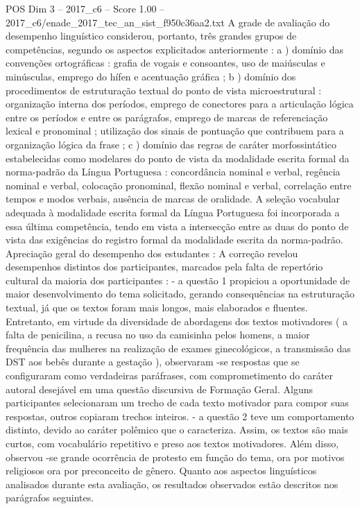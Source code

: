 \begin{textsample}{POS Dim 3 – 2017\_c6 – Score 1.00 – 2017\_c6/enade\_2017\_tec\_an\_sist\_f950c36aa2.txt}
A grade de avaliação do desempenho linguístico considerou, portanto, três grandes grupos de competências, segundo os aspectos explicitados anteriormente : a ) domínio das convenções ortográficas : grafia de vogais e consoantes, uso de maiúsculas e minúsculas, emprego do hífen e acentuação gráfica ; b ) domínio dos procedimentos de estruturação textual do ponto de vista microestrutural : organização interna dos períodos, emprego de conectores para a articulação lógica entre os períodos e entre os parágrafos, emprego de marcas de referenciação lexical e pronominal ; utilização dos sinais de pontuação que contribuem para a organização lógica da frase ; c ) domínio das regras de caráter morfossintático estabelecidas como modelares do ponto de vista da modalidade escrita formal da norma-padrão da Língua Portuguesa : concordância nominal e verbal, regência nominal e verbal, colocação pronominal, flexão nominal e verbal, correlação entre tempos e modos verbais, ausência de marcas de oralidade.
A seleção vocabular adequada à modalidade escrita formal da Língua Portuguesa foi incorporada a essa última competência, tendo em vista a intersecção entre as duas do ponto de vista das exigências do registro formal da modalidade escrita da norma-padrão.
Apreciação geral do desempenho dos estudantes : A correção revelou desempenhos distintos dos participantes, marcados pela falta de repertório cultural da maioria dos participantes : - a questão 1 propiciou a oportunidade de maior desenvolvimento do tema solicitado, gerando consequências na estruturação textual, já que os textos foram mais longos, mais elaborados e fluentes.
Entretanto, em virtude da diversidade de abordagens dos textos motivadores ( a falta de penicilina, a recusa no uso da camisinha pelos homens, a maior frequência das mulheres na realização de exames ginecológicos, a transmissão das DST aos bebês durante a gestação ), observaram -se respostas que se configuraram como verdadeiras paráfrases, com comprometimento do caráter autoral desejável em uma questão discursiva de Formação Geral.
Alguns participantes selecionaram um trecho de cada texto motivador para compor suas respostas, outros copiaram trechos inteiros. - a questão 2 teve um comportamento distinto, devido ao caráter polêmico que o caracteriza.
Assim, os textos são mais curtos, com vocabulário repetitivo e preso aos textos motivadores.
Além disso, observou -se grande ocorrência de protesto em função do tema, ora por motivos religiosos ora por preconceito de gênero.
Quanto aos aspectos linguísticos analisados durante esta avaliação, os resultados observados estão descritos nos parágrafos seguintes.

\end{textsample}
